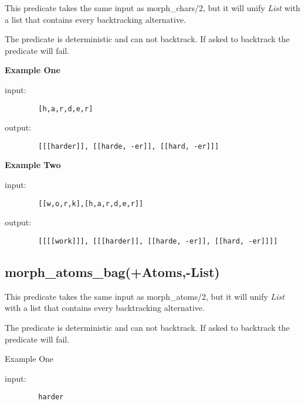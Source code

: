 This predicate takes the same input as morph\_chars/2, but it will
unify \emph{List} with a list that contains every backtracking
alternative.\newline

The predicate is deterministic and can not backtrack.  If asked to
backtrack the predicate will fail.\newline

\textbf{Example One}\newline

input:

        \begin{verbatim}
        [h,a,r,d,e,r]\end{verbatim}

output:

        \begin{verbatim}
        [[[harder]], [[harde, -er]], [[hard, -er]]]\end{verbatim}

\textbf{Example Two}\newline

input:

        \begin{verbatim}
        [[w,o,r,k],[h,a,r,d,e,r]]\end{verbatim}

output:

        \begin{verbatim}
        [[[[work]]], [[[harder]], [[harde, -er]], [[hard, -er]]]]\end{verbatim}

\subsection{morph\_atoms\_bag(+Atoms,-List)}

This predicate takes the same input as morph\_atoms/2, but it will
unify \emph{List} with a list that contains every backtracking
alternative.\newline

The predicate is deterministic and can not backtrack.  If asked to
backtrack the predicate will fail.\newline

Example One\newline

input:

        \begin{verbatim}
        harder\end{verbatim}

